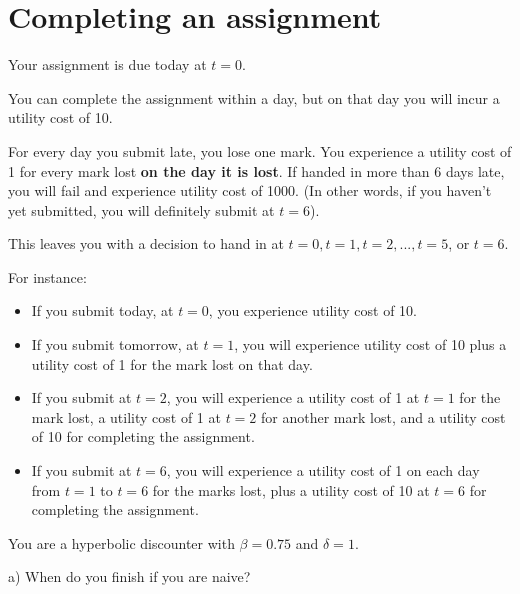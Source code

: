\documentclass[
  letterpaper,
  DIV=11,
  numbers=noendperiod]{scrreprt}
\providecommand{\tightlist}{%
  \setlength{\itemsep}{0pt}\setlength{\parskip}{0pt}}\usepackage{longtable,booktabs,array}
\begin{document}
\hypertarget{completing-an-assignment}{%
\section{Completing an assignment}\label{completing-an-assignment}}

Your assignment is due today at \(t=0\).

You can complete the assignment within a day, but on that day you will
incur a utility cost of 10.

For every day you submit late, you lose one mark. You experience a
utility cost of 1 for every mark lost \textbf{on the day it is lost}. If
handed in more than 6 days late, you will fail and experience utility
cost of 1000. (In other words, if you haven't yet submitted, you will
definitely submit at \(t=6\)).

This leaves you with a decision to hand in at
\(t = 0, t = 1, t = 2, ... , t = 5\), or \(t=6\).

For instance:

\begin{itemize}
\tightlist
\item
  If you submit today, at \(t=0\), you experience utility cost of 10.
\item
  If you submit tomorrow, at \(t=1\), you will experience utility cost
  of 10 plus a utility cost of 1 for the mark lost on that day.
\item
  If you submit at \(t=2\), you will experience a utility cost of 1 at
  \(t=1\) for the mark lost, a utility cost of 1 at \(t=2\) for another
  mark lost, and a utility cost of 10 for completing the assignment.
\item
  If you submit at \(t=6\), you will experience a utility cost of 1 on
  each day from \(t=1\) to \(t=6\) for the marks lost, plus a utility
  cost of 10 at \(t=6\) for completing the assignment.
\end{itemize}

You are a hyperbolic discounter with \(\beta=0.75\) and \(\delta=1\).

a) When do you finish if you are naive?
\end{document}
